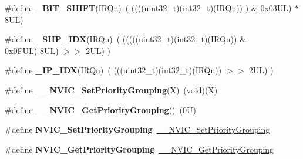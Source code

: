 \begin{DoxyCompactItemize}
\item 
\mbox{\label{group___c_m_s_i_s___core___n_v_i_c_functions_ga53c75b28823441c6153269f0ecbed878}} 
\#define {\bfseries \+\_\+\+B\+I\+T\+\_\+\+S\+H\+I\+FT}(I\+R\+Qn)~(  ((((uint32\+\_\+t)(int32\+\_\+t)(I\+R\+Qn))         )      \&  0x03\+U\+L) $\ast$ 8\+U\+L)
\item 
\mbox{\label{group___c_m_s_i_s___core___n_v_i_c_functions_gaee4f7eb5d7e770ad51489dbceabb1755}} 
\#define {\bfseries \+\_\+\+S\+H\+P\+\_\+\+I\+DX}(I\+R\+Qn)~( (((((uint32\+\_\+t)(int32\+\_\+t)(I\+R\+Qn)) \& 0x0\+F\+U\+L)-\/8\+U\+L) $>$$>$    2\+U\+L)      )
\item 
\mbox{\label{group___c_m_s_i_s___core___n_v_i_c_functions_ga370ec4b1751a6a889d849747df3763a9}} 
\#define {\bfseries \+\_\+\+I\+P\+\_\+\+I\+DX}(I\+R\+Qn)~(   (((uint32\+\_\+t)(int32\+\_\+t)(I\+R\+Qn))                $>$$>$    2\+U\+L)      )
\item 
\mbox{\label{group___c_m_s_i_s___core___n_v_i_c_functions_ga6834dd8c9c59394f1b544b57665293a4}} 
\#define {\bfseries \+\_\+\+\_\+\+N\+V\+I\+C\+\_\+\+Set\+Priority\+Grouping}(X)~(void)(X)
\item 
\mbox{\label{group___c_m_s_i_s___core___n_v_i_c_functions_gab2072fe50f6d7cd208f6768919f59fae}} 
\#define {\bfseries \+\_\+\+\_\+\+N\+V\+I\+C\+\_\+\+Get\+Priority\+Grouping}()~(0\+U)
\item 
\mbox{\label{group___c_m_s_i_s___core___n_v_i_c_functions_ga0e798d5aec68cdd8263db86a76df788f}} 
\#define {\bfseries N\+V\+I\+C\+\_\+\+Set\+Priority\+Grouping}~\mbox{\hyperlink{group___c_m_s_i_s___core___n_v_i_c_functions_gafc94dcbaee03e4746ade1f5bb9aaa56d}{\+\_\+\+\_\+\+N\+V\+I\+C\+\_\+\+Set\+Priority\+Grouping}}
\item 
\mbox{\label{group___c_m_s_i_s___core___n_v_i_c_functions_ga4eeb9214f2264fc23c34ad5de2d3fa11}} 
\#define {\bfseries N\+V\+I\+C\+\_\+\+Get\+Priority\+Grouping}~\mbox{\hyperlink{group___c_m_s_i_s___core___n_v_i_c_functions_ga9b894af672df4373eb637f8288845c05}{\+\_\+\+\_\+\+N\+V\+I\+C\+\_\+\+Get\+Priority\+Grouping}}

\end{DoxyCompactItemize}
